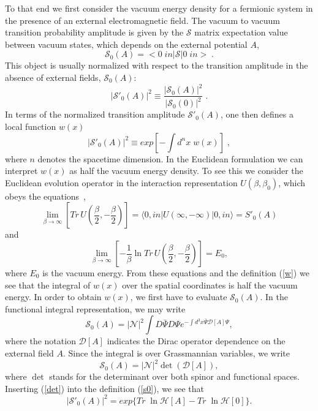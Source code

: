\documentclass[a4paper,12pt]{article}
\begin{document}
To that end we first consider the vacuum energy density for a
fermionic system in the presence of an external electromagnetic field.
The vacuum to vacuum transition probability amplitude is given by the
$\mathcal S$ matrix expectation value between vacuum states, which depends
on the external potential $A$,
\begin{equation}
{\mathcal S}_0(A)=< 0 \;in | {\mathcal S} | 0 \;in > \;.
\end{equation}
This object is usually normalized with respect to the transition
amplitude in the absence of external fields, ${\mathcal S}_0(A)$:
\begin{equation}\label{s0}
|{\mathcal S}'_0(A)|^2 \equiv \frac{|{\mathcal S}_0(A)|^2}
{|{\mathcal S}_0(0)|^2}\;.
\end{equation}
In terms of the normalized transition amplitude ${\mathcal S}'_0(A)$,
one then defines a local function $w(x)$~\cite{itzykson}
\begin{equation}\label{w}
|{\mathcal S}'_0(A)|^2 \equiv exp[-\int d^nx\;w(x)] \;,
\end{equation}
where $n$ denotes the spacetime dimension. In the Euclidean
formulation we can interpret $w(x)$ as half the vacuum energy density.
To see this we consider the Euclidean evolution operator in the
interaction representation $U(\beta,\beta_0)$, which obeys the
equations~\cite{zinnjustin},
\begin{equation}\label{S0euclideo}
\lim_{\beta\to\infty}[Tr\,U(\frac{\beta}{2},-\frac{\beta}{2})]=\langle0, in|U(\infty,-\infty)|0,in \rangle = S'_0(A)
\end{equation}
and
\begin{equation}\label{E0euclideo}
\lim_{\beta\to\infty}[-\frac{1}{\beta}\ln Tr\,U(\frac{\beta}{2},-\frac{\beta}{2})]=E_0,
\end{equation}
where $E_0$ is the vacuum energy. From these equations and the
definition (\ref{w}) we see that the integral of $w(x)$ over the
spatial coordinates is half the vacuum energy. In order to obtain
$w(x)$, we  first have to evaluate ${\mathcal S}_0(A)$. In the functional
integral representation, we may write
\begin{equation}\label{svacio}
{\mathcal S}_0(A)=|{\mathcal N}|^2 \int D\bar{\Psi} D\Psi e^{-\int d^3x \bar{\Psi} {\mathcal D}[A] \Psi},
\end{equation}
where the notation ${\mathcal D}[A]$ indicates the Dirac operator
dependence on the external field $A$. Since the integral is over
Grassmannian variables, we write
\begin{equation}\label{det}
{\mathcal S}_0(A)=|{\mathcal N}|^2 \det({\mathcal D}[A]),
\end{equation}
where $\det$ stands for the determinant over both spinor and functional
spaces. Inserting (\ref{det}) into the definition (\ref{s0}), we see that
\begin{equation}\label{sdet}
|{\mathcal S}'_0(A)|^2=exp\{Tr\;\ln{\mathcal H}[A]-Tr\;\ln{\mathcal H}[0]\}.
\end{equation}
\end{document}

